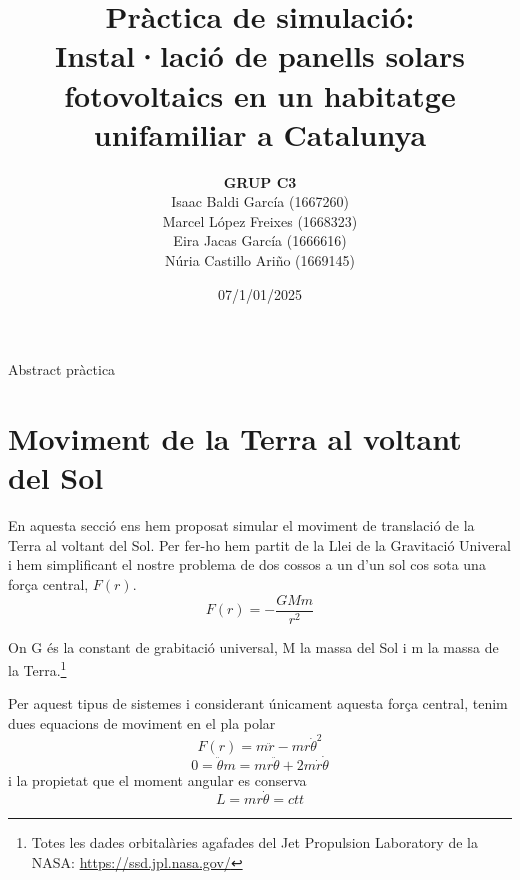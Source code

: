 \documentclass[11pt]{article}
\title{\Huge\bfseries Pràctica de simulació: \\ Instal·lació de panells solars fotovoltaics en un habitatge unifamiliar a Catalunya \\ [2ex] \Large}
\author{\begin{tabular}{c}
\textbf{GRUP C3} \\
Isaac Baldi García (1667260)\\
Marcel López Freixes (1668323) \\
Eira Jacas García (1666616) \\
Núria Castillo Ariño (1669145)
\end{tabular}}
\date{07/1/01/2025}
\begin{document}
\maketitle

Abstract pràctica 

\section{Moviment de la Terra al voltant del Sol} 
En aquesta secció ens hem proposat simular el moviment de translació de la Terra al voltant del Sol. Per fer-ho hem partit de la Llei de la Gravitació Univeral i hem simplificant el nostre problema de dos cossos a un d'un sol cos sota una força central, $F(r)$.
\begin{equation}
    F(r)=-\frac{GMm}{r^2}
\end{equation}

On G és la constant de grabitació universal, M la massa del Sol i m la massa de la Terra.\footnote{Totes les dades orbitalàries agafades del Jet Propulsion Laboratory de la NASA: \url{https://ssd.jpl.nasa.gov/}}

Per aquest tipus de sistemes i considerant únicament aquesta força central, tenim dues equacions de moviment en el pla polar 
\begin{equation}
    F(r)=m\ddot{r}-mr{\dot{\theta}}^2
    \label{equ_en_r}
\end{equation}
\begin{equation}
    0=\ddot{\theta}m=mr\ddot{\theta}+2m\dot{r}\dot{\theta}
    \label{equ_en_theta}
\end{equation}
i la propietat que el moment angular es conserva
\begin{equation}
    L=mr\dot{\theta}=ctt
    \label{moment_angular}
\end{equation}
\end{document}
